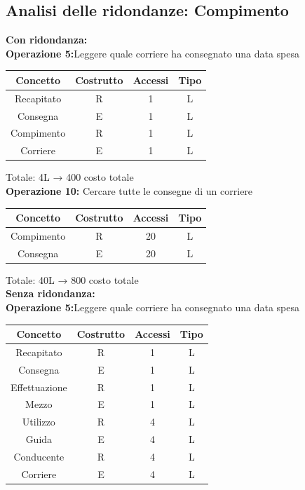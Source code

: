 \documentclass[a4paper,12pt]{report}
\begin{document}
\subsection{Analisi delle ridondanze: Compimento}
\textbf{Con ridondanza:}\\
\textbf{Operazione 5:}Leggere quale corriere ha consegnato una data spesa\\
\begin{center}
    \begin{tabular}{ | c   c   c   c | } 
    \hline
	Concetto&Costrutto&Accessi&Tipo\\
	\hline
	Recapitato&R&1&L\\
	\hline
    Consegna&E&1&L\\
	\hline
	Compimento&R&1&L\\
	\hline
	Corriere&E&1&L\\
	\hline
	\end{tabular}
\end{center}
Totale: 4L → 400 costo totale\\
\textbf{Operazione 10:}
Cercare tutte le consegne di un corriere\\
\begin{center}
    \begin{tabular}{ | c   c   c   c | } 
    \hline
	Concetto&Costrutto&Accessi&Tipo\\
	\hline
	Compimento&R&20&L\\
	\hline
    Consegna&E&20&L\\
	\hline
	\end{tabular}
\end{center}
Totale: 40L → 800 costo totale\\
\textbf{Senza ridondanza:}\\
\textbf{Operazione 5:}Leggere quale corriere ha consegnato una data spesa\\
\begin{center}
    \begin{tabular}{ | c   c   c   c | } 
    \hline
	Concetto&Costrutto&Accessi&Tipo\\
	\hline
	Recapitato&R&1&L\\
	\hline
    Consegna&E&1&L\\
	\hline
	Effettuazione&R&1&L\\
	\hline
	Mezzo&E&1&L\\
	\hline
	Utilizzo&R&4&L\\
	\hline
	Guida&E&4&L\\
	\hline
	Conducente&R&4&L\\
	\hline
	Corriere&E&4&L\\
	\hline
	\end{tabular}
\end{center}
\end{document}
